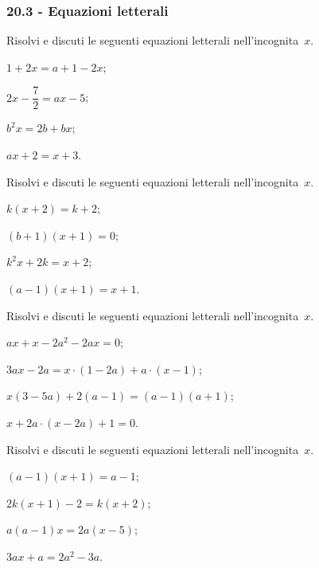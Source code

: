 \subsubsection*{20.3 - Equazioni letterali}

\begin{esercizio}[\Ast]
\label{ese:20.34}
Risolvi e discuti le seguenti equazioni letterali nell'incognita~$x$.
\begin{multicols}{2}
\begin{enumeratea}
 \item $1+2x=a+1-2x$;
 \item $2x-\dfrac{7}{2}=ax-5$;
 \item $b^{2}x=2b+bx$;
 \item $ax+2=x+3$.
\end{enumeratea}
\end{multicols}
\end{esercizio}

\begin{esercizio}[\Ast]
\label{ese:20.35}
Risolvi e discuti le seguenti equazioni letterali nell'incognita~$x$.
\begin{multicols}{2}
\begin{enumeratea}
 \item $k(x+2)=k+2$;
 \item $(b+1)(x+1)=0$;
 \item $k^{2}x+2k=x+2$;
 \item $(a-1)(x+1)=x+1$.
\end{enumeratea}
\end{multicols}
\end{esercizio}

\begin{esercizio}
\label{ese:20.36}
Risolvi e discuti le seguenti equazioni letterali nell'incognita~$x$.
\begin{multicols}{2}
\begin{enumeratea}
 \item $ax+x-2a^{2}-2ax=0$;
 \item $3ax-2a=x\cdot (1-2a)+a\cdot (x-1)$;
 \item $x (3-5a)+2 (a-1)=(a-1) (a+1)$;
 \item $x+2a\cdot (x-2a)+1=0$.
\end{enumeratea}
\end{multicols}
\end{esercizio}
\begin{esercizio}[\Ast]
\label{ese:20.37}
Risolvi e discuti le seguenti equazioni letterali nell'incognita~$x$.
\begin{multicols}{2}
\begin{enumeratea}
 \item $(a-1)(x+1)=a-1$;
 \item $2k(x+1)-2=k(x+2)$;
 \item $a(a-1)x=2a(x-5)$;
 \item $3ax+a=2a^{2}-3a$.
\end{enumeratea}
\end{multicols}
\end{esercizio}

